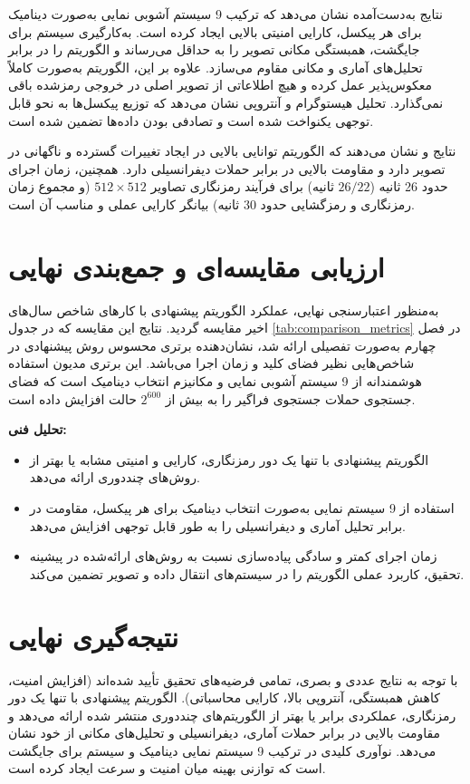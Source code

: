 نتایج به‌دست‌آمده نشان می‌دهد که ترکیب 9 سیستم آشوبی نمایی به‌صورت دینامیک برای هر پیکسل، کارایی امنیتی بالایی ایجاد کرده است. به‌کارگیری سیستم  برای جایگشت، همبستگی مکانی تصویر را به حداقل می‌رساند و الگوریتم را در برابر تحلیل‌های آماری و مکانی مقاوم می‌سازد. علاوه بر این، الگوریتم به‌صورت کاملاً معکوس‌پذیر عمل کرده و هیچ اطلاعاتی از تصویر اصلی در خروجی رمزشده باقی نمی‌گذارد. تحلیل هیستوگرام و آنتروپی نشان می‌دهد که توزیع پیکسل‌ها به نحو قابل توجهی یکنواخت شده است و تصادفی بودن داده‌ها تضمین شده است.

نتایج  و  نشان می‌دهند که الگوریتم توانایی بالایی در ایجاد تغییرات گسترده و ناگهانی در تصویر دارد و مقاومت بالایی در برابر حملات دیفرانسیلی دارد. همچنین، زمان اجرای حدود 26 ثانیه ($26/22$ ثانیه) برای فرآیند رمزنگاری تصاویر $512 \times 512$ (و مجموع زمان رمزنگاری و رمزگشایی حدود $30$ ثانیه) بیانگر کارایی عملی و مناسب آن است.

\section{ارزیابی مقایسه‌ای و جمع‌بندی نهایی}
به‌منظور اعتبارسنجی نهایی، عملکرد الگوریتم پیشنهادی با کارهای شاخص سال‌های اخیر مقایسه گردید. نتایج این مقایسه که در جدول \ref{tab:comparison_metrics} در فصل چهارم به‌صورت تفصیلی ارائه شد، نشان‌دهنده برتری محسوس روش پیشنهادی در شاخص‌هایی نظیر فضای کلید و زمان اجرا می‌باشد. این برتری مدیون استفاده هوشمندانه از 9 سیستم آشوبی نمایی و مکانیزم انتخاب دینامیک است که فضای جستجوی حملات جستجوی فراگیر را به بیش از $2^{600}$ حالت افزایش داده است.

\textbf{تحلیل فنی:}
\begin{itemize}
    \item الگوریتم پیشنهادی با تنها یک دور رمزنگاری، کارایی و امنیتی مشابه یا بهتر از روش‌های چنددوری ارائه می‌دهد.
    \item استفاده از 9 سیستم نمایی به‌صورت انتخاب دینامیک برای هر پیکسل، مقاومت در برابر تحلیل آماری و دیفرانسیلی را به طور قابل توجهی افزایش می‌دهد.
    \item زمان اجرای کمتر و سادگی پیاده‌سازی نسبت به روش‌های ارائه‌شده در پیشینه تحقیق، کاربرد عملی الگوریتم را در سیستم‌های انتقال داده و تصویر تضمین می‌کند.
\end{itemize}

\section{نتیجه‌گیری نهایی}
با توجه به نتایج عددی و بصری، تمامی فرضیه‌های تحقیق تأیید شده‌اند (افزایش امنیت، کاهش همبستگی، آنتروپی بالا، کارایی محاسباتی). الگوریتم پیشنهادی با تنها یک دور رمزنگاری، عملکردی برابر یا بهتر از الگوریتم‌های چنددوری منتشر شده ارائه می‌دهد و مقاومت بالایی در برابر حملات آماری، دیفرانسیلی و تحلیل‌های مکانی از خود نشان می‌دهد. نوآوری کلیدی در ترکیب 9 سیستم نمایی دینامیک و سیستم  برای جایگشت است که توازنی بهینه میان امنیت و سرعت ایجاد کرده است.

